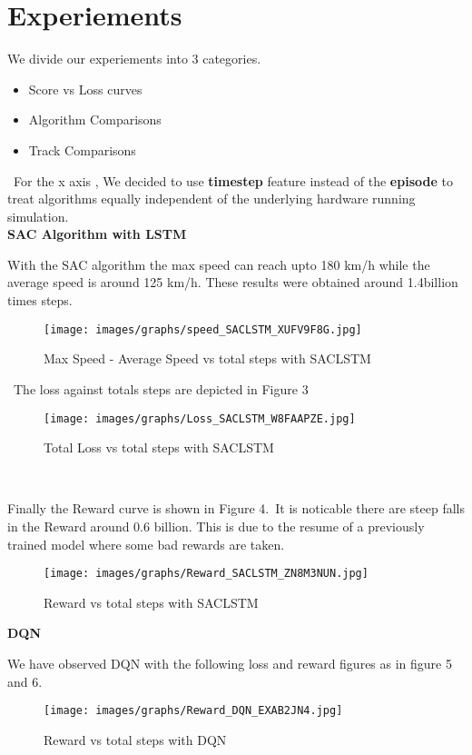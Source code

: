 \documentclass[conference]{IEEEtran}
\begin{document}
\section{Experiements}

We divide our experiements into 3 categories.

\begin{itemize}
    \item Score vs Loss curves
    \item Algorithm Comparisons
    \item Track Comparisons
\end{itemize}
\
For the x axis , We decided to use \textbf{timestep} feature instead of the \textbf{episode} to treat algorithms equally independent of the underlying hardware running simulation.\\

\textbf{SAC Algorithm with LSTM}\

With the SAC algorithm the max speed can reach upto 180 km/h while the average speed is around 125 km/h. These results were obtained around 1.4billion times steps.\

\begin{figure}[hbt!]
  \texttt{[image: images/graphs/speed\_SACLSTM\_XUFV9F8G.jpg]}
  \caption{Max Speed - Average Speed vs total steps with SACLSTM }
\end{figure}
\
The loss against totals steps are depicted in Figure 3\

\begin{figure}[hbt!]
  \texttt{[image: images/graphs/Loss\_SACLSTM\_W8FAAPZE.jpg]}
  \caption{Total Loss vs total steps with SACLSTM }
\end{figure}
\

Finally the Reward curve is shown in Figure 4.\
It is noticable there are steep falls in the Reward around 0.6 billion. This is due to the resume of a previously trained model where some bad rewards are taken.\

\begin{figure}[hbt!]
  \texttt{[image: images/graphs/Reward\_SACLSTM\_ZN8M3NUN.jpg]}
  \caption{Reward vs total steps with SACLSTM }
\end{figure}

\textbf{DQN}

We have observed DQN with the following loss and reward figures as in figure 5 and 6.\
\begin{figure}[hbt!]
  \texttt{[image: images/graphs/Reward\_DQN\_EXAB2JN4.jpg]}
  \caption{Reward vs total steps with DQN }
\end{figure}
\end{document}
